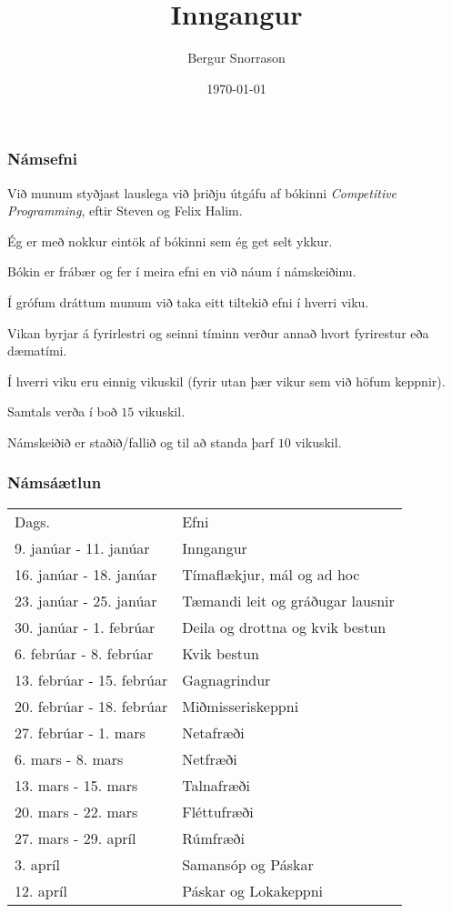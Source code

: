 \title{Inngangur}
\author{Bergur Snorrason}
\date{\today}



\frame{\titlepage}

{
	\frametitle{Námsefni}
	{
		\item<1-> Við munum styðjast lauslega við þriðju útgáfu af bókinni \emph{Competitive Programming}, eftir Steven og Felix Halim.
		\item<2-> Ég er með nokkur eintök af bókinni sem ég get selt ykkur.
		\item<3-> Bókin er frábær og fer í meira efni en við náum í námskeiðinu.
		\item<4-> Í grófum dráttum munum við taka eitt tiltekið efni í hverri viku.
		\item<5-> Vikan byrjar á fyrirlestri og seinni tíminn verður annað hvort fyrirestur eða dæmatími.
		\item<6-> Í hverri viku eru einnig vikuskil (fyrir utan þær vikur sem við höfum keppnir).
		\item<7-> Samtals verða í boð $15$ vikuskil.
		\item<8-> Námskeiðið er staðið/fallið og til að standa þarf $10$ vikuskil.
	}
}

{
	\frametitle{Námsáætlun}
	\begin{tabular}{l l}
		Dags. & Efni\\
		9. janúar - 11. janúar & Inngangur\\
		16. janúar - 18. janúar & Tímaflækjur, mál og ad hoc\\
		23. janúar - 25. janúar & Tæmandi leit og gráðugar lausnir\\
		30. janúar - 1. febrúar & Deila og drottna og kvik bestun\\
		6. febrúar - 8. febrúar & Kvik bestun\\
		13. febrúar - 15. febrúar & Gagnagrindur\\
		20. febrúar - 18. febrúar & Miðmisseriskeppni\\
		27. febrúar - 1. mars & Netafræði\\
		6. mars - 8. mars & Netfræði\\
		13. mars - 15. mars & Talnafræði\\
		20. mars - 22. mars & Fléttufræði\\
		27. mars - 29. apríl & Rúmfræði\\
		3. apríl & Samansóp og Páskar\\
		12. apríl & Páskar og Lokakeppni\\
	\end{tabular}
}

